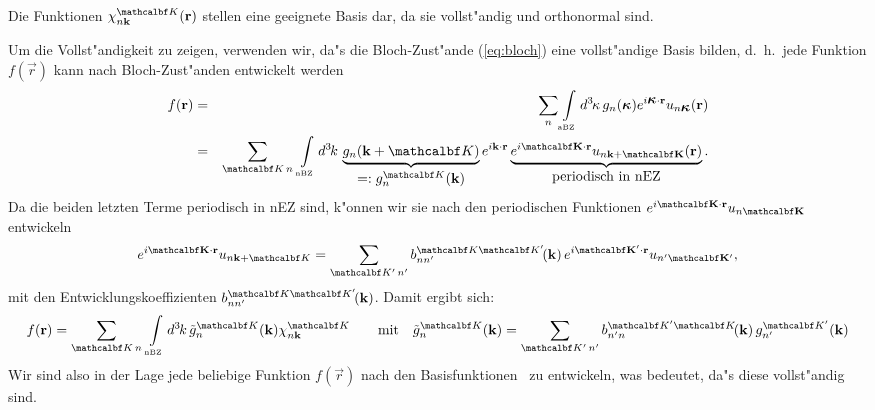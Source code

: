
Die Funktionen $\basis(\vec{r})$ stellen eine geeignete Basis dar,
da sie vollst"andig und orthonormal sind.

Um die Vollst"andigkeit zu zeigen, verwenden wir, da"s die Bloch-Zust"ande
(\ref{eq:bloch}) eine vollst"andige Basis bilden, d.~h.\ jede Funktion
$f(\vec{r})$ kann nach  Bloch-Zust"anden entwickelt werden 
%
\begin{eqnarray*}
  f(\vec{r}) & = & \sum_{n} \bzint{aBZ} \vdx{\akb} 
        g_{n}(\ak) e^{i\sprod{\ak}{r}} u_{n\ak}(\vec{r}) \\
  & = & \sum_{\set \,n} \: \bzint{nBZ} \vdx{\nkb}
  \underbrace{g_{n}(\nk+\set)}_{\Ts =: g_{n}^{\set}(\nk)} 
  e^{i\sprod{\nk}{r}} \underbrace{e^{i\sprod{\set}{r}}
  u_{n\vec{\nk+\set}}(\vec{r})}_{\mbox{periodisch in nEZ}}.
\end{eqnarray*}
%
Da die beiden letzten Terme periodisch in nEZ sind, k"onnen wir sie nach den
periodischen Funktionen $e^{i\sprod{\set}{r}} u_{n\vec{\set}}$
entwickeln
%
\begin{displaymath}
  e^{i\sprod{\set}{r}} u_{n \nk+\set} = \sum_{\pri{\set}\,\pri{n}}
  b^{\set \pri{\set}}_{n \pri{n}} \! (\nk) \,
  e^{i\sprod{\pri{\set}}{r}} u_{\pri{n} \vec{\pri{\set}}} ,
\end{displaymath}
%
mit den Entwicklungskoeffizienten $b^{\set \pri{\set}}_{n \pri{n}} \! (\nk)$. 
Damit ergibt sich:
%
\begin{displaymath}
  f(\vec{r}) = \sum_{\set \,n} \: \bzint{nBZ} \vdx{\nkb}
  \tilde{g}_{n}^{\set}(\nk) \basis 
  \qquad \mbox{mit} \quad
  \tilde{g}_{n}^{\set}(\nk) = \sum_{\pri{\set}\,\pri{n}}
  b^{\pri{\set} \set}_{\pri{n} n} \! (\nk) \,
  g_{\pri{n}}^{\pri{\set}}(\nk) 
\end{displaymath}
%
Wir sind also in der Lage jede beliebige Funktion $f(\vec{r})$ nach den
Basisfunktionen \basis\ zu entwickeln, was bedeutet, da"s diese vollst"andig
sind. 

